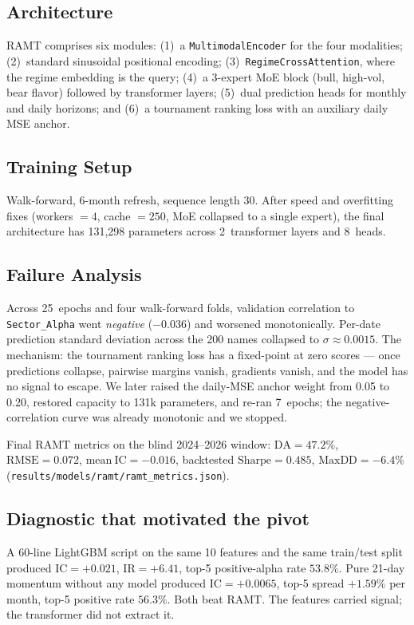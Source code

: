 \documentclass[conference]{IEEEtran}
\begin{document}
\subsection{Architecture}
RAMT comprises six modules:
(1)~a \texttt{MultimodalEncoder} for the four modalities;
(2)~standard sinusoidal positional encoding;
(3)~\texttt{RegimeCrossAttention}, where the regime embedding is the query;
(4)~a 3-expert MoE block (bull, high-vol, bear flavor) followed by transformer layers;
(5)~dual prediction heads for monthly and daily horizons; and
(6)~a tournament ranking loss with an auxiliary daily MSE anchor.

\subsection{Training Setup}
Walk-forward, 6-month refresh, sequence length 30. After speed and
overfitting fixes (workers $=4$, cache $=250$, MoE collapsed to a single
expert), the final architecture has 131{,}298 parameters across 2~transformer
layers and 8~heads.

\subsection{Failure Analysis}
Across 25~epochs and four walk-forward folds, validation correlation to
\texttt{Sector\_Alpha} went \emph{negative} ($-0.036$) and worsened
monotonically. Per-date prediction standard deviation across the 200 names
collapsed to $\sigma \approx 0.0015$. The mechanism: the tournament ranking
loss has a fixed-point at zero scores --- once predictions collapse, pairwise
margins vanish, gradients vanish, and the model has no signal to escape. We
later raised the daily-MSE anchor weight from 0.05 to 0.20, restored capacity
to 131k parameters, and re-ran 7~epochs; the negative-correlation curve was
already monotonic and we stopped.

Final RAMT metrics on the blind 2024--2026 window:
$\mathrm{DA}=47.2\%$, $\mathrm{RMSE}=0.072$, $\mathrm{mean\ IC}=-0.016$,
backtested $\mathrm{Sharpe}=0.485$, $\mathrm{MaxDD}=-6.4\%$
(\texttt{results/models/ramt/ramt\_metrics.json}).

\subsection{Diagnostic that motivated the pivot}
A 60-line LightGBM script on the same 10 features and the same train/test
split produced $\mathrm{IC}=+0.021$, $\mathrm{IR}=+6.41$, top-5 positive-alpha
rate $53.8\%$. Pure 21-day momentum without any model produced
$\mathrm{IC}=+0.0065$, top-5 spread $+1.59\%$ per month, top-5 positive rate
$56.3\%$. Both beat RAMT. The features carried signal; the transformer did not
extract it.
\end{document}
